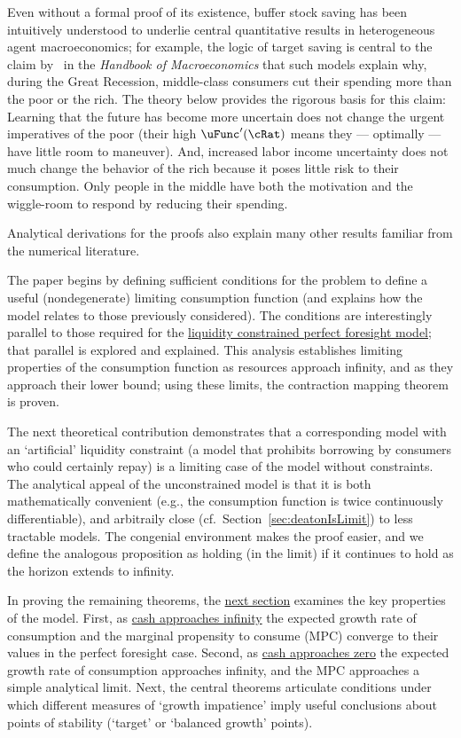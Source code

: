 \documentclass[ProjectDLO]{subfiles}
\begin{document}
\hypertarget{KMP}{} Even without a formal proof of its existence, buffer stock saving has been intuitively understood to underlie central quantitative results in heterogeneous agent macroeconomics; for example, the logic of target saving is central to the claim by~\cite{kmpHandbook} in the \textit{Handbook of Macroeconomics} that such models explain why, during the Great Recession, middle-class consumers cut their spending more than the poor or the rich.  The theory below provides the rigorous basis for this claim:  Learning that the future has become more uncertain does not change the urgent imperatives of the poor (their high $\uFunc^{\prime}(\cRat)$ means they --- optimally --- have little room to maneuver).  And, increased labor income uncertainty does not much change the behavior of the rich because it poses little risk to their consumption.  Only people in the middle have both the motivation and the wiggle-room to respond by reducing their spending.

Analytical derivations for the proofs also explain many other results familiar from the numerical literature.

The paper begins by defining sufficient conditions for the problem to define a useful (nondegenerate) limiting consumption function (and explains how the model relates to those previously considered).  The conditions are interestingly parallel to those required for the \hyperlink{Factors-Defined-And-Compared}{liquidity constrained perfect foresight model}; that parallel is explored and explained.  This analysis establishes limiting properties of the consumption function as resources approach infinity, and as they approach their lower bound; using these limits, the contraction mapping theorem is proven.

The next theoretical contribution demonstrates that a corresponding model with an `artificial' liquidity constraint (a model that prohibits borrowing by consumers who could certainly repay) is a limiting case of the model without constraints. The analytical appeal of the unconstrained model is that it is both mathematically convenient (e.g., the consumption function is twice continuously differentiable), and arbitraily close (cf.\ Section~\ref{sec:deatonIsLimit}) to less tractable models. The congenial environment makes the proof easier, and we define the analogous proposition as holding (in the limit) if it continues to hold as the horizon extends to infinity.

In proving the remaining theorems, the \hyperlink{AnalysisoftheConvergedConsumptionFunction}{next section} examines the key properties of the model. First, as \hyperlink{LimitsAsmtToInfty}{cash approaches infinity} the expected growth rate of consumption and the marginal propensity to consume (MPC) converge to their values in the perfect foresight case. Second, as \hyperlink{LimitsAsmtToZero}{cash approaches zero} the expected growth rate of consumption approaches infinity, and the MPC approaches a simple analytical limit.  Next, the central theorems articulate conditions under which different measures of `growth impatience' imply useful conclusions about points of stability (`target' or `balanced growth' points).
\end{document}
